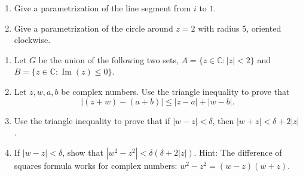 \documentclass[11pt]{article}
\newcommand{\C}{\mathbb{C}}
\newcommand{\im}{\operatorname{Im}}
\begin{document}
\begin{enumerate}
\setcounter{enumi}{\theenumCount}
\item Give a parametrization of the line segment from $i$ to $1$.  
\vfill

\item Give a parametrization of the circle around $z = 2$ with radius 5, oriented clockwise. 
\vfill

\setcounter{enumCount}{\theenumi}
\end{enumerate}


\noindent
\begin{enumerate}
\setcounter{enumi}{\theenumCount}
\item Let $G$ be the union of the following two sets, $A= \{ z \in \C :  |z| < 2 \}$ and $B=\{z \in \C : \im(z) \le 0 \}$. 


\newpage

\item Let $z, w, a, b$ be complex numbers.  Use the triangle inequality to prove that 
$$| (z+w) - (a+b) | \le | z-a | + | w - b |.$$
\vfill
\vfill

\item Use the triangle inequality to prove that if $|w- z| < \delta$, then $|w+z| < \delta + 2|z|$.
\vfill
\vfill

\item If $|w - z| < \delta$, show that $|w^2 - z^2 | < \delta (\delta + 2|z|)$. Hint: The difference of squares formula works for complex numbers: $w^2-z^2 = (w-z)(w+z)$.
\vfill
\vfill



\setcounter{enumCount}{\theenumi}
\end{enumerate}
\end{document}
